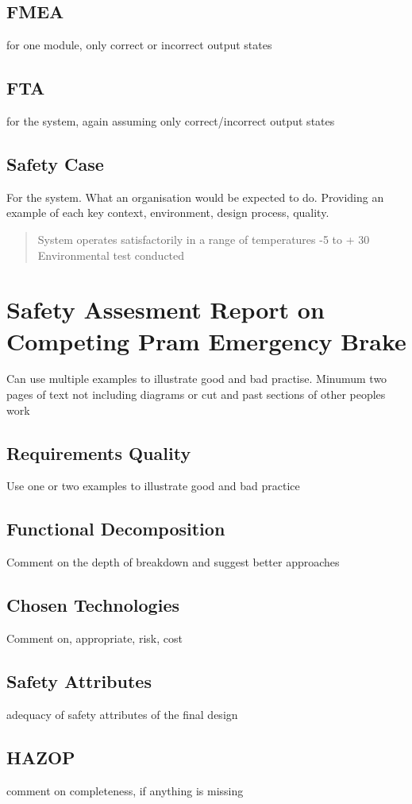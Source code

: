\documentclass[12pt,a4paper]{article}
\begin{document}
\subsection{FMEA}
for one module, only correct or incorrect output states
\subsection{FTA}
for the system, again assuming only correct/incorrect output states
\subsection{Safety Case}
For the system. What an organisation would be expected to do. Providing an example of each key context, environment, design process, quality.
\begin{quote}
System operates satisfactorily in a range of temperatures -5 to + 30 Environmental test conducted
\end{quote}


\section[Task Two]{Safety Assesment Report on Competing Pram Emergency Brake}\medskip
Can use multiple examples to illustrate good and bad practise. Minumum two pages of text not including diagrams
or cut and past sections of other peoples work
\subsection{Requirements Quality}
Use one or two examples to illustrate good and bad practice
\subsection{Functional Decomposition}
Comment on the depth of breakdown and suggest better approaches
\subsection{Chosen Technologies}
Comment on, appropriate, risk, cost
\subsection{Safety Attributes}
adequacy of safety attributes of the final design
\subsection{HAZOP}
comment on completeness, if anything is missing
\end{document}
